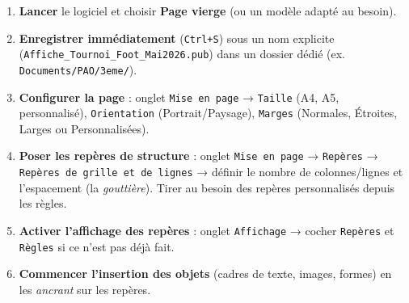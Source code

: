 \documentclass[11pt]{article}
\begin{document}
\begin{methode}
\begin{enumerate}
    \item \textbf{Lancer} le logiciel et choisir \textbf{Page vierge} (ou un modèle adapté au besoin).
    \item \textbf{Enregistrer immédiatement} (\texttt{Ctrl+S}) sous un nom explicite (\texttt{Affiche\_Tournoi\_Foot\_Mai2026.pub}) dans un dossier dédié (ex. \texttt{Documents/PAO/3eme/}).
    \item \textbf{Configurer la page} : onglet \texttt{Mise en page} → \texttt{Taille} (A4, A5, personnalisé), \texttt{Orientation} (Portrait/Paysage), \texttt{Marges} (Normales, Étroites, Larges ou Personnalisées).
    \item \textbf{Poser les repères de structure} : onglet \texttt{Mise en page} → \texttt{Repères} → \texttt{Repères de grille et de lignes} → définir le nombre de colonnes/lignes et l'espacement (la \emph{gouttière}). Tirer au besoin des repères personnalisés depuis les règles.
    \item \textbf{Activer l'affichage des repères} : onglet \texttt{Affichage} → cocher \texttt{Repères} et \texttt{Règles} si ce n'est pas déjà fait.
    \item \textbf{Commencer l'insertion des objets} (cadres de texte, images, formes) en les \emph{ancrant} sur les repères.
\end{enumerate}
\end{methode}
\end{document}

